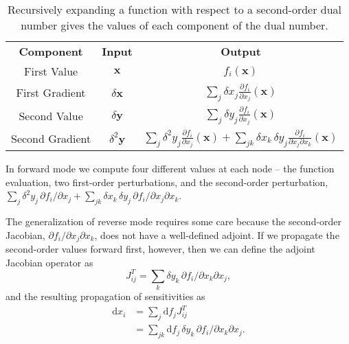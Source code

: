 \begin{table*}[t!]
	\centering
	\renewcommand{\arraystretch}{2}
	\begin{tabular}{ccc}
	\rowcolor[gray]{0.9} \textbf{Component} & \textbf{Input} & \textbf{Output} \\
	First Value & 
	$\mathbf{x}$ & 
	$f_{i} \! \left( \mathbf{x} \right)$ 
	\\
	\rowcolor[gray]{0.9} 
	First Gradient & 
	$\delta \mathbf{x}$ &
	$\displaystyle \sum_{j} \delta x_{j}  \frac{ \partial f_{i} }{ \partial x_{j} } \! \left( \mathbf{x} \right)$
	\\
	Second Value & 
	$\delta \mathbf{y} $ & 
	$\displaystyle \sum_{j} \delta y_{j} \frac{ \partial f_{i} }{ \partial x_{j} } \! \left( \mathbf{x} \right)$
	\\
	\rowcolor[gray]{0.9} 
	Second Gradient & 
	$\delta^{2} \mathbf{y} $ & 
	$\displaystyle \sum_{j} \delta^{2} y_{j} \frac{ \partial f_{i} }{ \partial x_{j} } \! \left( \mathbf{x} \right)
	+ \sum_{jk} \delta x_{k} \, \delta y_{j}
	\frac{ \partial f_{i} }{ \partial x_{j} \partial x_{k} } \! \left( \mathbf{x} \right)$
	\\
	\end{tabular}
	\caption{Recursively expanding a function with respect to a second-order dual number 
	gives the values of each component of the dual number.
	\label{tab:secondOrder}}
\end{table*}

In forward mode we compute four different values at each node -- the function
evaluation, two first-order perturbations, and the second-order perturbation,
$ \sum_{j} \delta^{2} y_{j} \, \partial f_{i} / \partial x_{j}
+ \sum_{jk} \delta x_{k} \, \delta y_{j} \, \partial f_{i} / \partial x_{j} \partial x_{k}$.

The generalization of reverse mode requires some care because the second-order
Jacobian, $\partial f_{i} / \partial x_{j} \partial x_{k}$, does not have a well-defined
adjoint.  If we propagate the second-order values forward first, however,
then we can define the adjoint Jacobian operator as
%
\begin{equation*}
J^{T}_{ij} = \sum_{k} \delta y_{k} \, \partial f_{i} / \partial x_{k} \partial x_{j},
\end{equation*}
%
and the resulting propagation of sensitivities as
%
\begin{align*}
\mathrm{d} x_{i} 
&= 
\sum_{j} \mathrm{d} f_{j} J^{T}_{ij} 
\\
&= 
\sum_{jk} \mathrm{d} f_{j} \, \delta y_{k} \, \partial f_{i} / \partial x_{k} \partial x_{j}.
\end{align*}

